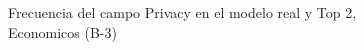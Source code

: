 \begin{figure}[H]
    \centering
    
    \caption{Frecuencia del campo Privacy en el modelo real y Top 2, Economicos (B-3)}
    \label{frecuency-Privacy-top2}
\end{figure}
